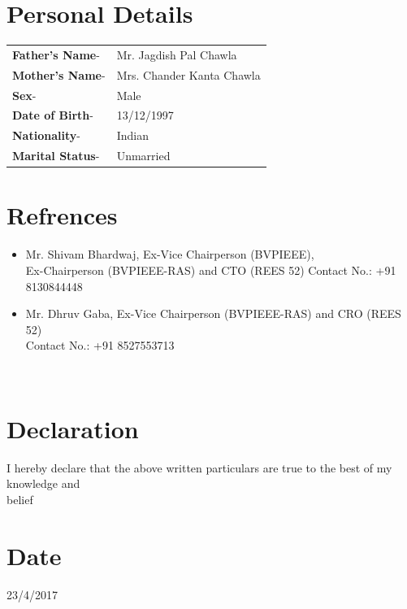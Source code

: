 \documentclass[11pt]{article}
\begin{document}
\begin{minipage}{0.80\linewidth}
\section{\color{yellow}Per\color{black}sonal Details}
\begin{tabular}{l l}
\textbf{Father's Name}-& Mr. Jagdish Pal Chawla\\ 
\textbf{Mother's Name}-& Mrs. Chander Kanta Chawla\\
\textbf{Sex}-& Male\\
\textbf{Date of Birth}-& 13/12/1997\\
\textbf{Nationality}-& Indian\\
\textbf{Marital Status}-& Unmarried\\
\end{tabular}
\section{\color{magenta}Ref\color{black}rences}
\begin{itemize}
\item Mr. Shivam Bhardwaj, Ex-Vice Chairperson (BVPIEEE),\\Ex-Chairperson (BVPIEEE-RAS) and CTO (REES 52)
Contact No.: +91 8130844448
\item Mr. Dhruv Gaba, Ex-Vice Chairperson (BVPIEEE-RAS) and CRO (REES 52)\\
Contact No.: +91 8527553713
\end{itemize}
\end{minipage}
\begin{minipage}{0.20\linewidth}
~\\
\end{minipage}
\begin{minipage}{0.80\linewidth}
\section{\color{red}Dec\color{black}laration}
I hereby declare that the above written particulars are true to the best of my knowledge and\\ belief
\section{\color{green}Dat\color{black}e}
23/4/2017
\end{minipage}
\end{document}
